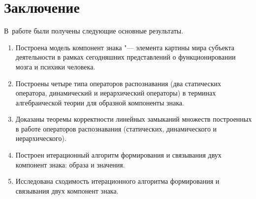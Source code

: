 \chapter*{Заключение}						%

В~работе были получены следующие основные результаты.

\begin{enumerate}
	\renewcommand\labelenumi{\theenumi.}
	\item Построена модель компонент знака "--- элемента картины мира субъекта деятельности в рамках сегодняшних представлений о функционировании мозга и психики человека.
	\item Построены четыре типа операторов распознавания (два статических оператора, динамический и иерархический операторы) в терминах алгебраической теории для образной компоненты знака.
	\item Доказаны теоремы корректности линейных замыканий множеств построенных в работе операторов распознавания (статических, динамического и иерархического).
	\item Построен итерационный алгоритм формирования и связывания двух компонент знака: образа и значения.
	\item Исследована сходимость итерационного алгоритма формирования и связывания двух компонент знака.
\end{enumerate}

\clearpage